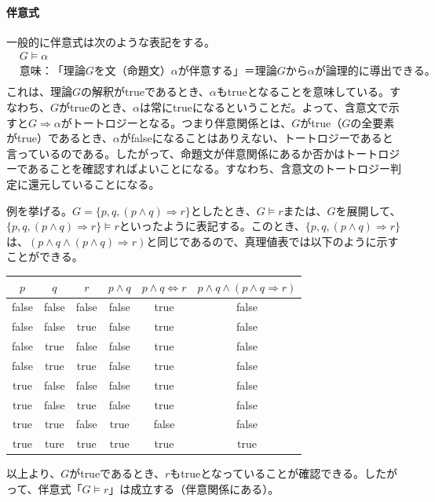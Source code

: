 \documentclass[dvipdfmx]{jsarticle}
\begin{document}
\paragraph{伴意式}一般的に伴意式は次のような表記をする。
\begin{align*}
  & G \models \alpha \\
  &意味：「理論Gを文（命題文）\alpha が伴意する」＝ 理論Gから\alpha が論理的に導出できる。\\
\end{align*}
これは、理論$G$の解釈がtrueであるとき、$\alpha$もtrueとなることを意味している。すなわち、$G$がtrueのとき、$\alpha$は常にtrueになるということだ。よって、含意文で示すと$G \Rightarrow \alpha がトートロジー$となる。つまり伴意関係とは、$G$がtrue（$G$の全要素がtrue）であるとき、$\alpha$がfalseになることはありえない、トートロジーであると言っているのである。したがって、命題文が伴意関係にあるか否かはトートロジーであることを確認すればよいことになる。すなわち、含意文のトートロジー判定に還元していることになる。\par
例を挙げる。$G = \{p, q, (p \wedge q)\Rightarrow r\}としたとき、G \models r$または、$G$を展開して、$\{p, q, (p \wedge q)\Rightarrow r\} \models r$といったように表記する。このとき、$\{p, q, (p \wedge q)\Rightarrow r\}$は、$(p \wedge q \wedge (p\wedge q)\Rightarrow r)$と同じであるので、真理値表では以下のように示すことができる。
\begin{table}[H]
  \centering
\begin{tabular}{|ccc||c|c|c|} \hline
$p$   & $q$   & $r$   & $p \wedge q$ & $p\wedge q \Leftrightarrow r$ & $p \wedge q \wedge (p \wedge q \Rightarrow r)$ \\ \hline
false & false & false & false        & true                          & false                                          \\ \hline
false & false & true  & false        & true                          & false                                          \\ \hline
false & true  & false & false        & true                          & false                                          \\ \hline
false & true  & true  & false        & true                          & false                                          \\ \hline
true  & false & false & false        & true                          & false                                          \\ \hline
true  & false & true  & false        & true                          & false                                          \\ \hline
true  & true  & false & true         & false                         & false                                          \\ \hline
true  & ture  & true  & true         & true                          & true \\ \hline
\end{tabular}
\end{table}
以上より、$G$がtrueであるとき、$r$もtrueとなっていることが確認できる。したがって、伴意式「$G \models r$」は成立する（伴意関係にある）。
\end{document}

